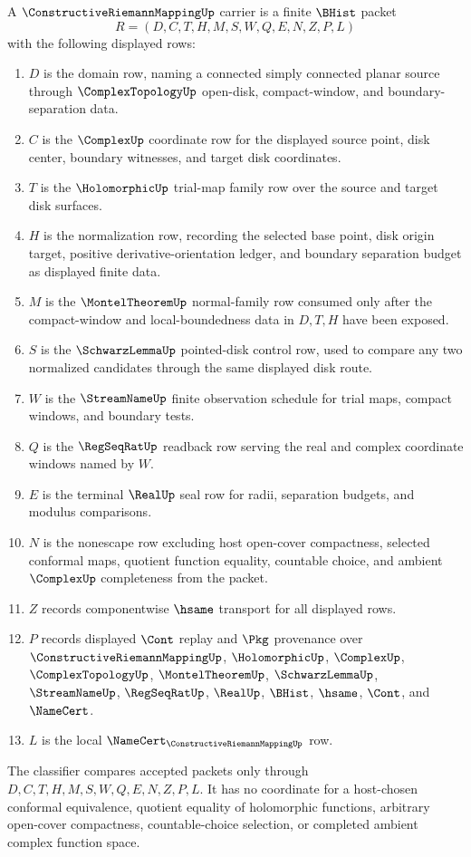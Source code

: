 \begin{definition}
\label{def:constructive-riemann-mapping-carrier}
A $\ConstructiveRiemannMappingUp$ carrier is a finite $\BHist$ packet
$$
R=(D,C,T,H,M,S,W,Q,E,N,Z,P,L)
$$
with the following displayed rows:
\begin{enumerate}
\item $D$ is the domain row, naming a connected simply connected planar source through $\ComplexTopologyUp$ open-disk, compact-window, and boundary-separation data.
\item $C$ is the $\ComplexUp$ coordinate row for the displayed source point, disk center, boundary witnesses, and target disk coordinates.
\item $T$ is the $\HolomorphicUp$ trial-map family row over the source and target disk surfaces.
\item $H$ is the normalization row, recording the selected base point, disk origin target, positive derivative-orientation ledger, and boundary separation budget as displayed finite data.
\item $M$ is the $\MontelTheoremUp$ normal-family row consumed only after the compact-window and local-boundedness data in $D,T,H$ have been exposed.
\item $S$ is the $\SchwarzLemmaUp$ pointed-disk control row, used to compare any two normalized candidates through the same displayed disk route.
\item $W$ is the $\StreamNameUp$ finite observation schedule for trial maps, compact windows, and boundary tests.
\item $Q$ is the $\RegSeqRatUp$ readback row serving the real and complex coordinate windows named by $W$.
\item $E$ is the terminal $\RealUp$ seal row for radii, separation budgets, and modulus comparisons.
\item $N$ is the nonescape row excluding host open-cover compactness, selected conformal maps, quotient function equality, countable choice, and ambient $\ComplexUp$ completeness from the packet.
\item $Z$ records componentwise $\hsame$ transport for all displayed rows.
\item $P$ records displayed $\Cont$ replay and $\Pkg$ provenance over $\ConstructiveRiemannMappingUp$, $\HolomorphicUp$, $\ComplexUp$, $\ComplexTopologyUp$, $\MontelTheoremUp$, $\SchwarzLemmaUp$, $\StreamNameUp$, $\RegSeqRatUp$, $\RealUp$, $\BHist$, $\hsame$, $\Cont$, and $\NameCert$.
\item $L$ is the local $\NameCert_{\ConstructiveRiemannMappingUp}$ row.
\end{enumerate}
The classifier compares accepted packets only through $D,C,T,H,M,S,W,Q,E,N,Z,P,L$. It has no coordinate for a host-chosen conformal equivalence, quotient equality of holomorphic functions, arbitrary open-cover compactness, countable-choice selection, or completed ambient complex function space.
\end{definition}

